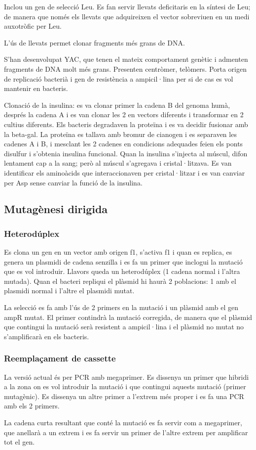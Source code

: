 Inclou un gen de selecció Leu. Es fan servir llevats deficitaris en la
síntesi de Leu; de manera que només els llevats que adquireixen el
vector sobreviuen en un medi auxotròfic per Leu.

L'ús de llevats permet clonar fragments més grans de DNA.

S'han desenvolupat YAC, que tenen el mateix comportament genètic i
admenten fragments de DNA molt més grans. Presenten centròmer,
telòmers. Porta origen de replicació bacterià i gen de resistència a
ampicil·lina per si de cas es vol mantenir en bacteris.

Clonació de la insulina: es va clonar primer la cadena B del genoma
humà, després la cadena A i es van clonar les 2 en vectors diferents i
transformar en 2 cultius diferents. Els bacteris degradaven la
proteïna i es va decidir fusionar amb la beta-gal. La proteïna es
tallava amb bromur de cianogen i es separaven les cadenes A i B, i
mesclant les 2 cadenes en condicions adequades feien els ponts
disulfur i s'obtenia insulina funcional. Quan la insulina s'injecta al
múscul, difon lentament cap a la sang; però al múscul s'agregava i
cristal·litzava. Es van identificar els aminoàcids que interaccionaven
per cristal·litzar i es van canviar per Asp sense canviar la funció de
la insulina.

\subsection{Mutagènesi dirigida}
\label{sec:mutagenesi-dirigida}

\subsubsection{Heterodúplex}
\label{sec:heteroduplex}
Es clona un gen en un vector amb origen f1, s'activa f1 i quan es
replica, es genera un plasmidi de cadena senzilla i es fa un primer
que inclogui la mutació que es vol introduir.  Llavors queda un
heterodúplex (1 cadena normal i l'altra mutada). Quan el bacteri
repliqui el plàsmid hi haurà 2 poblacions: 1 amb el plasmidi normal i
l'altre el plasmidi mutat.

La selecció es fa amb l'ús de 2 primers en la mutació i un plàsmid amb
el gen ampR mutat. El primer contindrà la mutació corregida, de manera
que el plàsmid que contingui la mutació serà resistent a ampicil·lina
i el plàsmid no mutat no s'amplificarà en els bacteris.

\subsubsection{Reemplaçament de cassette}
\label{sec:reempl-de-cass}


La versió actual és per PCR amb megaprimer. Es dissenya un primer que
hibridi a la zona on es vol introduir la mutació i que contingui
aquests mutació (primer mutagènic). Es dissenya un altre primer a
l'extrem més proper i es fa una PCR amb els 2 primers.

La cadena curta resultant que conté la mutació es fa servir com a
megaprimer, que anellarà a un extrem i es fa servir un primer de
l'altre extrem per amplificar tot el gen.